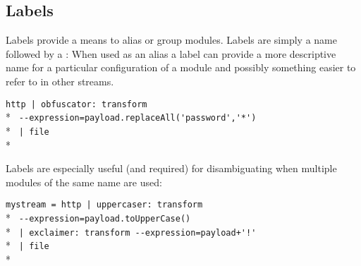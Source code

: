 \subsection{Labels}

Labels provide a means to alias or group modules. Labels are simply a name followed by a : When used as an alias a label can provide a more descriptive name for a particular configuration of a module and possibly something easier to refer to in other streams.

\verb;http | obfuscator: transform;\\* 
\verb; --expression=payload.replaceAll('password','*');\\*
\verb; | file;\\*

Labels are especially useful (and required) for disambiguating when multiple modules of the same name are used:

\verb;mystream = http | uppercaser: transform ;\\* 
\verb; --expression=payload.toUpperCase();\\*
\verb; | exclaimer: transform --expression=payload+'!';\\*
\verb; | file;\\*



